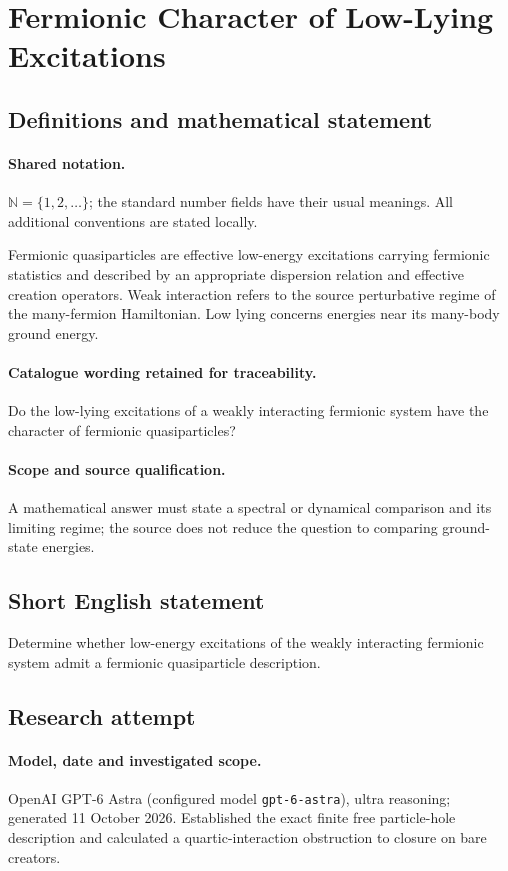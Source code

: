 \documentclass[11pt]{article}
\begin{document}
\section{Fermionic Character of Low-Lying Excitations}\label{statement}

\subsection{Definitions and mathematical statement}

\paragraph{Shared notation.}$\mathbb N=\{1,2,\ldots\}$; the standard number fields have their usual meanings. All additional conventions are stated locally.


Fermionic quasiparticles are effective low-energy excitations carrying fermionic statistics and described by an appropriate dispersion relation and effective creation operators. Weak interaction refers to the source perturbative regime of the many-fermion Hamiltonian. Low lying concerns energies near its many-body ground energy.

\paragraph{Catalogue wording retained for traceability.}
Do the low-lying excitations of a weakly interacting fermionic system have the character of fermionic quasiparticles?

\paragraph{Scope and source qualification.}A mathematical answer must state a spectral or dynamical comparison and its limiting regime; the source does not reduce the question to comparing ground-state energies.
\subsection{Short English statement}
Determine whether low-energy excitations of the weakly interacting fermionic system admit a fermionic quasiparticle description.
\subsection{Research attempt}
\paragraph{Model, date and investigated scope.}
OpenAI GPT-6 Astra (configured model \texttt{gpt-6-astra}), ultra reasoning; generated 11 October 2026. Established the exact finite free particle-hole description and calculated a quartic-interaction obstruction to closure on bare creators.
\end{document}
